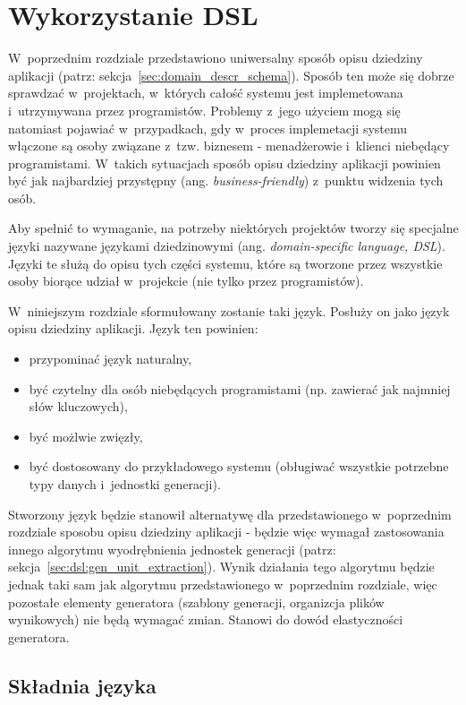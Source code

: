 \chapter{Wykorzystanie DSL}

W~poprzednim rozdziale przedstawiono uniwersalny sposób opisu dziedziny aplikacji (patrz: sekcja~\ref{sec:domain_descr_schema}).
Sposób ten może się dobrze sprawdzać w~projektach, w~których całość systemu jest implemetowana i~utrzymywana przez programistów.
Problemy z~jego użyciem mogą się natomiast pojawiać w~przypadkach, gdy w~proces implemetacji systemu włączone są osoby związane z~tzw. biznesem - menadżerowie i~klienci niebędący programistami.
W~takich sytuacjach sposób opisu dziedziny aplikacji powinien być jak najbardziej przystępny (ang. \emph{business-friendly}) z~punktu widzenia tych osób.

Aby spełnić to wymaganie, na potrzeby niektórych projektów tworzy się specjalne języki nazywane językami dziedzinowymi (ang. \emph{domain-specific language, DSL}).
Języki te służą do opisu tych części systemu, które są tworzone przez wszystkie osoby biorące udział w~projekcie (nie tylko przez programistów).

W~niniejszym rozdziale sformułowany zostanie taki język.
Posłuży on jako język opisu dziedziny aplikacji.
Język ten powinien:

\begin{itemize}
 \item przypominać język naturalny,
 \item być czytelny dla osób niebędących programistami (np. zawierać jak najmniej słów kluczowych),
 \item być możlwie zwięzły,
 \item być dostosowany do przykładowego systemu (obługiwać wszystkie potrzebne typy danych i~jednostki generacji).
\end{itemize}

Stworzony język będzie stanowił alternatywę dla przedstawionego w~poprzednim rozdziale sposobu opisu dziedziny aplikacji - będzie więc wymagał zastosowania innego algorytmu wyodrębnienia jednostek generacji (patrz: sekcja~\ref{sec:dsl:gen_unit_extraction}).
Wynik działania tego algorytmu będzie jednak taki sam jak algorytmu przedstawionego w~poprzednim rozdziale, więc pozostałe elementy generatora (szablony generacji, organizcja plików wynikowych) nie będą wymagać zmian.
Stanowi do dowód elastyczności generatora.



\section{Składnia języka}

